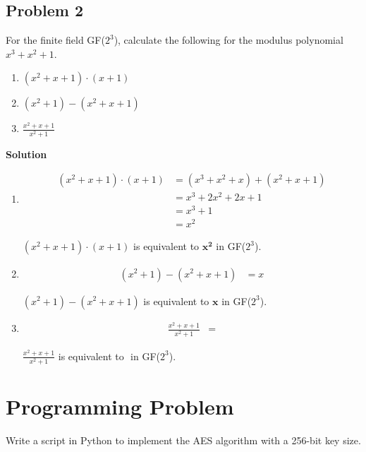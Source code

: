 \documentclass[11pt]{article}
\begin{document}
\pagebreak

\subsection{Problem 2}
For the finite field GF($2^3$), calculate the following for the modulus polynomial $x^3+x^2+1$.

\begin{enumerate}[label=(\alph*)]
\item $(x^2+x+1) \cdot (x + 1)$
\item $(x^2 + 1) - (x^2 + x + 1)$
\item $\displaystyle{\frac{x^2 + x + 1}{x^2 + 1}}$
\end{enumerate}

\textbf{Solution}

\begin{enumerate}[label=(\alph*)]
\item
\[
	\begin{split}
		(x^2+x+1) \cdot (x + 1) &= (x^3 + x^2 + x) + (x^2 + x + 1)
		\\
		&= x^3 + 2x^2 + 2x + 1
		\\
		&= x^3 + 1
		\\
		&= x^2
	\end{split}
\]

$(x^2+x+1) \cdot (x + 1)$ is equivalent to $\mathbf{x^2}$ in GF($2^3$).

\item
\[
	\begin{split}
		(x^2 + 1) - (x^2 + x + 1) &= x
	\end{split}
\]

$(x^2 + 1) - (x^2 + x + 1)$ is equivalent to $\mathbf{x}$ in GF($2^3$).

\item
\[
	\begin{split}
		\displaystyle{\frac{x^2 + x + 1}{x^2 + 1}} &= 
	\end{split}
\]

$\displaystyle{\frac{x^2 + x + 1}{x^2 + 1}}$ is equivalent to $\mathbf{}$ in GF($2^3$).

\end{enumerate}

\pagebreak


\section{Programming Problem}

Write a script in Python to implement the AES algorithm with a 256-bit key size. 
\end{document}
